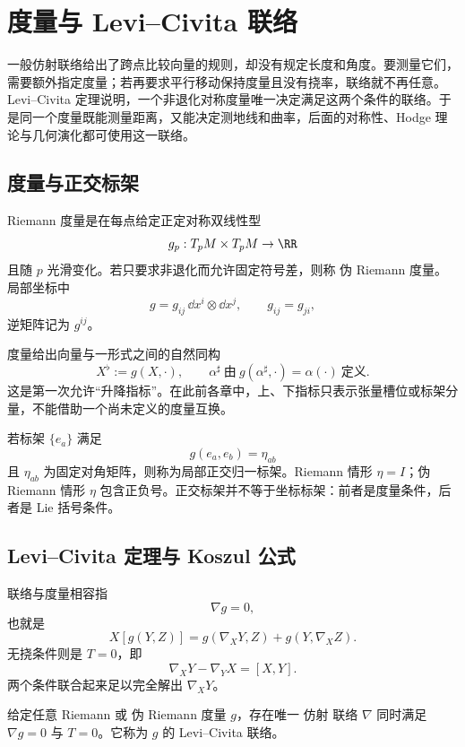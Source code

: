 \chapter{度量与 Levi--Civita 联络} \label{chap:math-connections}

一般仿射联络给出了跨点比较向量的规则，却没有规定长度和角度。要测量它们，需要额外指定度量；若再要求平行移动保持度量且没有挠率，联络就不再任意。Levi--Civita 定理说明，一个非退化对称度量唯一决定满足这两个条件的联络。于是同一个度量既能测量距离，又能决定测地线和曲率，后面的对称性、Hodge 理论与几何演化都可使用这一联络。

\section{度量与正交标架}

Riemann 度量是在每点给定正定对称双线性型
\[
g_p:T_pM\times T_pM\to\RR
\]
且随 $p$ 光滑变化。若只要求非退化而允许固定符号差，则称 伪 Riemann 度量。局部坐标中
\begin{equation*}g=g_{ij}\,\dd x^i\otimes\dd x^j,
\qquad
g_{ij}=g_{ji},
\end{equation*}
逆矩阵记为 $g^{ij}$。

度量给出向量与一形式之间的自然同构
\begin{equation*}X^\flat:=g(X,\cdot),
\qquad
\alpha^\sharp\ \text{由}\ g(\alpha^\sharp,\cdot)=\alpha(\cdot)\ \text{定义}.
\end{equation*}
这是第一次允许“升降指标”。在此前各章中，上、下指标只表示张量槽位或标架分量，不能借助一个尚未定义的度量互换。

若标架 $\{e_a\}$ 满足
\[
g(e_a,e_b)=\eta_{ab}
\]
且 $\eta_{ab}$ 为固定对角矩阵，则称为局部正交归一标架。Riemann 情形 $\eta=I$；伪 Riemann 情形 $\eta$ 包含正负号。正交标架并不等于坐标标架：前者是度量条件，后者是 Lie 括号条件。

\section{Levi--Civita 定理与 Koszul 公式}

联络与度量相容指
\begin{equation*}\nabla g=0,
\end{equation*}
也就是
\[
X[g(Y,Z)]
=g(\nabla_XY,Z)+g(Y,\nabla_XZ).
\]
无挠条件则是 $T=0$，即
\[
\nabla_XY-\nabla_YX=[X,Y].
\]
两个条件联合起来足以完全解出 $\nabla_XY$。

\begin{theorem}\label{thm:math-dg-levi-civita}
给定任意 Riemann 或 伪 Riemann 度量 $g$，存在唯一 仿射 联络 $\nabla$ 同时满足
$\nabla g=0$ 与 $T=0$。它称为 $g$ 的 Levi--Civita 联络。
\end{theorem}

